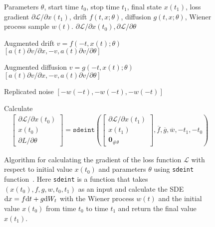 \begin{figure}[htb]
  \begin{algorithm}[H]
    \caption{Algorithm for calculating the gradient of the loss function $\mathcal{L}$ with respect to initial value $x(t_{0})$ and parameters $\theta$ using \texttt{sdeint} function~\cite{li2020}.
    Here \texttt{sdeint} is a function that takes $(x(t_{0}),f,g,w,t_{0},t_{1})$ as an input and calculate the SDE $\mathrm{d} x=f\mathrm{d} t+g\mathrm{d} W_{t}$ with the Wiener process $w(t)$ and the initial value $x(t_{0})$ from time $t_{0}$ to time $t_{1}$ and return the final value $x(t_{1})$.}
    \label{alg:neural-sde}
    \begin{algorithmic}
    \Input Parameters $\theta$, start time $t_{0}$, stop time $t_{1}$, final
    state $x(t_{1})$, loss gradient $\partial \mathcal{L}/\partial x(t_{1})$, drift $f(t,x;\theta)$, diffusion $g(t,x;\theta)$, Wiener process sample $w(t)$.
    \Output $\partial \mathcal{L}/\partial x(t_{0}), \partial \mathcal{L}/\partial\theta$

     \Comment Augmented drift
    \State $v=f(-t,x(t);\theta)$
    \State \Return $[a(t)\partial v/\partial x, -v, a(t)\partial v/\partial\theta]$
    \EndFunction

     \Comment Augmented diffusion
    \State $v=g(-t,x(t);\theta)$
    \State \Return $[a(t)\partial v/\partial x, -v, a(t)\partial v/\partial\theta]$
    \EndFunction

     \Comment Replicated noise
    \State \Return $[-w(-t), -w(-t), -w(-t)]$
    \EndFunction

    \State Calculate
    \begin{align*}
      \begin{bmatrix}
        \partial \mathcal{L}/\partial x(t_{0}) \\ x(t_{0})\\ \partial L/\partial \theta
      \end{bmatrix}
      =\texttt{sdeint}\left(
        \begin{bmatrix}
          \partial \mathcal{L}/\partial x(t_{1}) \\ x(t_{1})\\ \bm{0}_{\#\theta}
        \end{bmatrix},
        \overline{f},\overline{g},\overline{w},-t_{1},-t_{0}
      \right)
    \end{align*}
    \end{algorithmic}
  \end{algorithm}
\end{figure}
